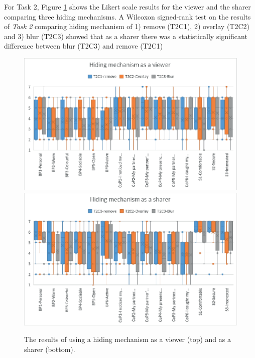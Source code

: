 For Task 2, Figure \ref{fig:frontier18:result-hiding} shows the Likert scale results for the viewer and the sharer comparing three hiding mechanisms. A Wilcoxon signed-rank test on the results of \textit{Task 2} comparing hiding mechanism of 1) remove (T2C1), 2) overlay (T2C2) and 3) blur (T2C3) showed that as a sharer there was a statistically significant difference between blur (T2C3) and remove (T2C1)

\begin{figure}[H]
    \begin{center}
    \includegraphics[width=0.9\linewidth]{images/frontier18/images-05.eps}
    \includegraphics[width=0.9\linewidth]{images/frontier18/images-06.eps}
    \caption{The results of using a hiding mechanism as a viewer (top) and as a sharer (bottom).}\label{fig:frontier18:result-hiding}
    \end{center}
\end{figure}

